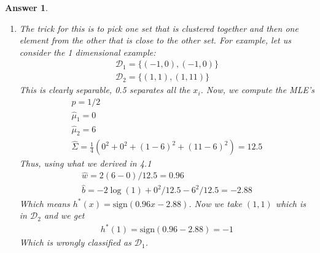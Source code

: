 \documentclass[12pt]{article}
\theoremstyle{colon}
\newtheorem*{answer}{Answer}
\begin{document}
\begin{answer}
\begin{enumerate}[label=\arabic*)]
    \item The trick for this is to pick one set that is clustered together and then one element from the other that is close to the other set. For example, let us consider the 1 dimensional example:
      \begin{gather*}
        \mathcal{D}_1 = \{ (-1,0), (-1,0) \} \\
        \mathcal{D}_2= \{ (1,1), (1,11) \}
      \end{gather*}
      This is clearly separable, 0.5 separates all the $x_i$. Now, we compute the MLE's
      \begin{gather*}
        \hat{p} = 1/2 \\
        \hat{\mu}_1 = 0 \\
        \hat{\mu}_2 = 6 \\
        \hat{\Sigma} = \frac{1}{4} (0^2 + 0^2 + (1-6)^2 + (11-6)^2) = 12.5
      \end{gather*}
      Thus, using what we derived in 4.1
      \begin{gather*}
        \hat{w} = 2 (6 - 0)/12.5 = 0.96 \\
        \hat{b} = - 2 \log(1) + 0^2 / 12.5 - 6^2 /12.5 = -2.88
      \end{gather*}
      Which means $h^*(x) = \text{sign}(0.96 x - 2.88)$. Now we take $(1,1)$ which is in $\mathcal{D}_2$ and we get
      \begin{gather*}
        h^*(1) = \text{sign}(0.96 - 2.88) = -1
      \end{gather*}
      Which is wrongly classified as $\mathcal{D}_1$.
  \end{enumerate}
\end{answer}

\clearpage
\end{document}
